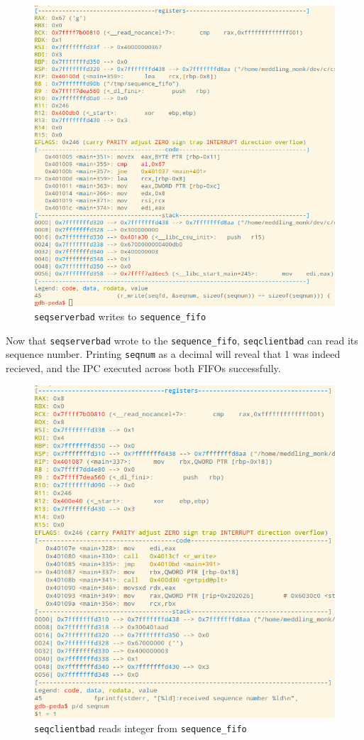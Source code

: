 \documentclass[letter,12pt,sffamily]{article}
\begin{document}
\begin{figure}[H]
	\centering
	\includegraphics[width=1\linewidth]{./images/31}
	\caption[seqserverbad_sequence_fifo_write]{\texttt{seqserverbad} writes to \texttt{sequence_fifo}}
	\label{fig:33}
\end{figure}
Now that \texttt{seqserverbad} wrote to the \texttt{sequence_fifo}, \texttt{seqclientbad} can read its sequence number.
Printing \texttt{seqnum} as a decimal will reveal that 1 was indeed recieved, and the IPC executed across both FIFOs successfully.
\begin{figure}[H]
	\centering
	\includegraphics[width=1\linewidth]{./images/32}
	\caption[seqclientbad_sequence_fifo_read]{\texttt{seqclientbad} reads integer from \texttt{sequence_fifo}}
	\label{fig:34}
\end{figure}
\end{document}

